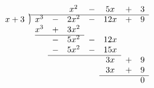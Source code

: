 \documentclass[preview]{standalone}
\newcommand{\longdiv}{\smash{\mkern-0.43mu\vstretch{1.31}{\hstretch{.7}{)}}\mkern-5.2mu\vstretch{1.31}{\hstretch{.7}{)}}}}
\begin{document}
\begin{equation*}
    \begin{array}{*1r @{\hskip\arraycolsep}c@{\hskip\arraycolsep} *{7}c}
      &          &     &   & x^2  & - & 5x  & + & 3\\
        \cline{2-9}
x + 3 & \longdiv & x^3 & - & 2x^2 & - & 12x & + & 9\\
      &          & x^3 & + & 3x^2 &   &     &   & \\
        \cline{3-5}
      &          &     & - & 5x^2 & - & 12x &   & \\
      &          &     & - & 5x^2 & - & 15x &   & \\
        \cline{4-7}
      &          &     &   &      &   & 3x  & + & 9\\
      &          &     &   &      &   & 3x  & + & 9\\
        \cline{7-9}
      &          &     &   &      &   &     &   & 0\\
\end{array}
\end{equation*}
\end{document}

